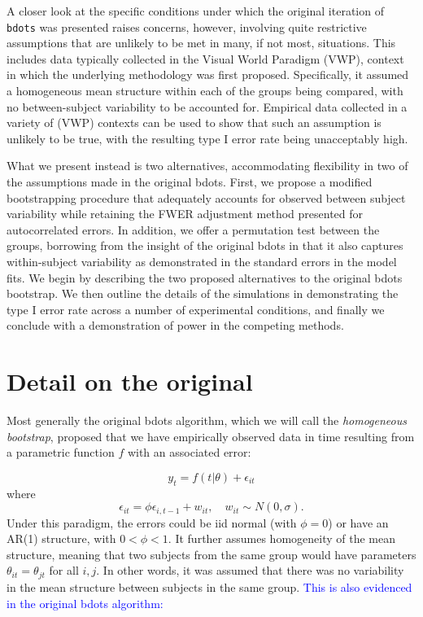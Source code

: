 \documentclass{article}
\newcommand{\xt}{\texttt}
\providecommand{\cn}[1]{\textcolor{blue}{#1}}
\begin{document}
A closer look at the specific conditions under which the original iteration of \xt{bdots} was presented raises concerns, however, involving quite restrictive assumptions that are unlikely to be met in many, if not most, situations. This includes data typically collected in the Visual World Paradigm (VWP), context in which the underlying methodology was first proposed. Specifically, it assumed a homogeneous mean structure within each of the groups being compared, with no between-subject variability to be accounted for. Empirical data collected in a variety of (VWP) contexts can be used to show that such an assumption is unlikely to be true, with the resulting type I error rate being unacceptably high.

What we present instead is two alternatives, accommodating flexibility in two of the assumptions made in the original bdots. First, we propose a modified bootstrapping procedure that adequately accounts for observed between subject variability while retaining the FWER adjustment method presented for autocorrelated errors. In addition, we offer a permutation test between the groups, borrowing from the insight of the original bdots in that it also captures within-subject variability as demonstrated in the standard errors in the model fits. We begin by describing the two proposed alternatives to the original bdots bootstrap. We then outline the details of the simulations in demonstrating the type I error rate across a number of experimental conditions, and finally we conclude with a demonstration of power in the competing methods.


\section{Detail on the original}

Most generally the original bdots algorithm, which we will call the \textit{homogeneous bootstrap}, proposed that we have empirically observed data in time resulting from a parametric function $f$ with an associated error: 

\begin{equation}\label{eq:mean_structure}
y_{t} = f(t|\theta) + \epsilon_{it}
\end{equation}
where 
\begin{equation}
\epsilon_{it} = \phi \epsilon_{i, t-1} + w_{it}, \quad w_{it} \sim N(0, \sigma).
\end{equation}
Under this paradigm, the errors could be iid normal (with $\phi = 0$) or have an AR(1) structure, with $0 < \phi < 1$. It further assumes homogeneity of the mean structure, meaning that two subjects from the same group would have parameters $\theta_{it} = \theta_{jt}$ for all $i, j$. In other words, it was assumed that there was no variability in the mean structure between subjects in the same group. \cn{This is also evidenced in the original bdots algorithm: }
\end{document}
